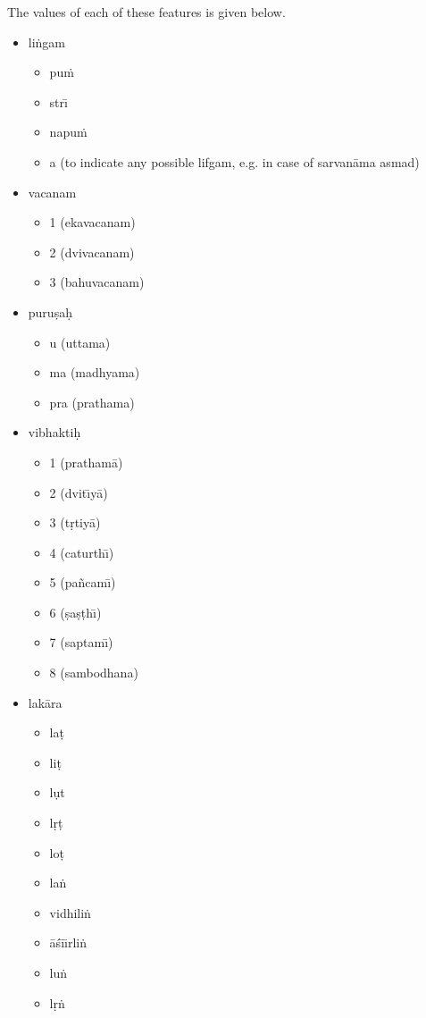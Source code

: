 \documentclass{article}
\begin{document}
\noindent 
The values of each of these features is given below.\\
\begin{itemize}
\item li\.{n}gam
\begin{itemize}
\item pu\.{m}
\item str{\=\i}
\item napu\.{m}
\item a (to indicate any possible lifgam, e.g. in case of sarvan{\=a}ma asmad)
\end{itemize}

\item vacanam
\begin{itemize}
\item 1 (ekavacanam)
\item 2 (dvivacanam)
\item 3 (bahuvacanam)
\end{itemize}

\item puru\d{s}a\d{h}
\begin{itemize}
\item u (uttama)
\item ma (madhyama)
\item pra (prathama)
\end{itemize}

\item vibhakti\d{h}
\begin{itemize}
\item 1 (pratham{\=a})
\item 2 (dvit{\=\i}y{\=a})
\item 3 (t\d{r}tiy{\=a})
\item 4 (caturth{\=\i})
\item 5 (pa\~ncam{\=\i})
\item 6 (\d{s}a\d{s}\d{t}h{\=\i})
\item 7 (saptam{\=\i})
\item 8 (sambodhana)
\end{itemize}

\item lak{\=a}ra
\begin{itemize}
\item la\d{t}
\item li\d{t}
\item l\d{ut}
\item l\d{r}\d{t}
\item lo\d{t}
\item la\.{n}
\item vidhili\.{n}
\item {\=a}\'{s}{\=\i}{\=\i}rli\.{n}
\item lu\.{n}
\item l\d{r}\.{n}
\end{itemize}


\end{itemize}
\end{document}
